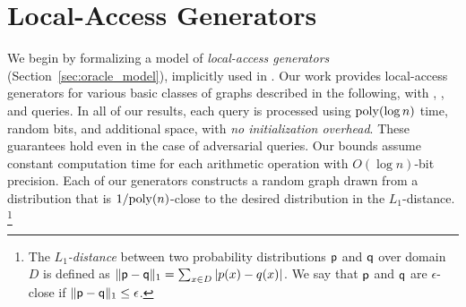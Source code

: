 \section{Local-Access Generators}
We begin by formalizing a model of {\em local-access generators} (Section~\ref{sec:oracle_model}), implicitly used in \cite{reut}.
Our work provides local-access generators for various basic classes of graphs described in the following, with 
, , and  queries.
In all of our results, each query is processed using $\mathrm{poly}(\log n)$ time, random bits, and additional space, with \emph{no initialization overhead}.
These guarantees hold even in the case of adversarial queries.
Our bounds assume constant computation time for each arithmetic operation with $O(\log n)$-bit precision.
Each of our generators constructs a random graph drawn from a distribution that is $1/\mathrm{poly}(n)$-close to the desired distribution in the $L_1$-distance.
\footnote{The \emph{$L_1$-distance} between two probability distributions $\mathsf{p}$ and $\mathsf{q}$ over domain $D$
is defined as $\|\mathsf{p-q}\|_1 = \sum_{x \in D } |p(x)-q(x)|$.
We say that $\mathsf{p}$ and $\mathsf{q}$ are $\epsilon$-close if $\|\mathsf{p-q}\|_1 \leq \epsilon$.}

